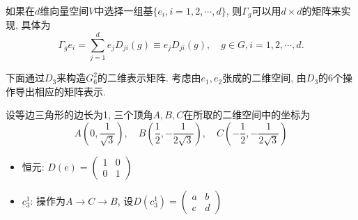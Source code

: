 \documentclass[UTF8]{ctexart}
\begin{document}
如果在$d$维向量空间$V$中选择一组基$\{e_i, i = 1, 2, \cdots, d\}$, 则$\varGamma_g$可以用$d \times d$的矩阵来实现, 具体为
\begin{equation}
\varGamma_g e_i = \sum_{j = 1}^{d} e_j D_{ji} (g) \equiv e_j D_{ji}(g), \quad g \in G, i = 1,2, \cdots, d.
\end{equation}

下面通过$D_3$来构造$G_6^2$的二维表示矩阵. 考虑由$e_1, e_2$张成的二维空间, 由$D_3$的6个操作导出相应的矩阵表示.

设等边三角形的边长为1, 三个顶角$A, B, C$在所取的二维空间中的坐标为
\begin{equation}
A(0, \frac{1}{\sqrt{3}}), \quad B(\frac{1}{2}, -\frac{1}{2\sqrt{3}}), \quad C(-\frac{1}{2}, -\frac{1}{2\sqrt{3}})
\end{equation}

\begin{itemize}
\item 恒元: $D(e) =
  \begin{pmatrix}
    1 & 0 \\
    0 & 1 
  \end{pmatrix}
$
\item $c_3^1$: 操作为$A\rightarrow C\rightarrow B$, 设$D(c_3^1) =
  \begin{pmatrix}
    a & b \\
    c & d
  \end{pmatrix}
$


\end{itemize}
\end{document}
